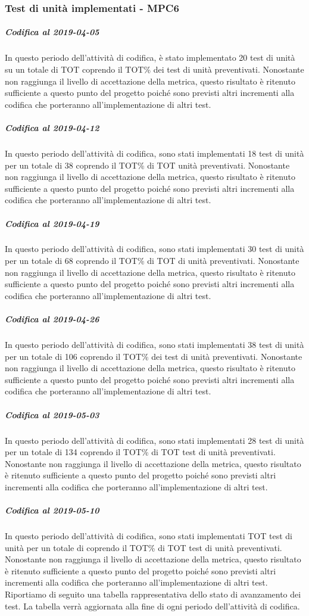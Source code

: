 \subsubsection{Test di unità implementati - MPC6}
\subparagraph{Codifica al 2019-04-05}
In questo periodo dell'attività di codifica, è stato implementato 20 test di unità su un totale di TOT coprendo il TOT\% dei test di unità preventivati.
Nonostante non raggiunga il livello di accettazione della
metrica, questo risultato è ritenuto sufficiente a questo punto del progetto poiché sono previsti altri incrementi alla codifica che porteranno all'implementazione di altri test.

\subparagraph{Codifica al 2019-04-12}
In questo periodo dell'attività di codifica, sono stati implementati 18 test di unità per un totale di 38 coprendo il TOT\% di TOT unità preventivati.
Nonostante non raggiunga il livello di accettazione della
metrica, questo risultato è ritenuto sufficiente a questo punto del progetto poiché sono previsti altri incrementi alla codifica che porteranno all'implementazione di altri test.

\subparagraph{Codifica al 2019-04-19}
In questo periodo dell'attività di codifica, sono stati implementati 30 test di unità per un totale di 68 coprendo il TOT\% di TOT di unità preventivati.
Nonostante non raggiunga il livello di accettazione della
metrica, questo risultato è ritenuto sufficiente a questo punto del progetto poiché sono previsti altri incrementi alla codifica che porteranno all'implementazione di altri test.

\subparagraph{Codifica al 2019-04-26}
In questo periodo dell'attività di codifica, sono stati implementati 38 test di unità per un totale di 106 coprendo il TOT\% dei test di unità preventivati.
Nonostante non raggiunga il livello di accettazione della
metrica, questo risultato è ritenuto sufficiente a questo punto del progetto poiché sono previsti altri incrementi alla codifica che porteranno all'implementazione di altri test.

\subparagraph{Codifica al 2019-05-03}
In questo periodo dell'attività di codifica, sono stati implementati 28 test di unità per un totale di 134 coprendo il TOT\% di TOT test di unità preventivati.
Nonostante non raggiunga il livello di accettazione della
metrica, questo risultato è ritenuto sufficiente a questo punto del progetto poiché sono previsti altri incrementi alla codifica che porteranno all'implementazione di altri test.

\subparagraph{Codifica al 2019-05-10}
In questo periodo dell'attività di codifica, sono stati implementati TOT test di unità per un totale di  coprendo il TOT\% di TOT test di unità preventivati.
Nonostante non raggiunga il livello di accettazione della
metrica, questo risultato è ritenuto sufficiente a questo punto del progetto poiché sono previsti altri incrementi alla codifica che porteranno all'implementazione di altri test.
\\Riportiamo di seguito una tabella rappresentativa dello stato di avanzamento dei test. La tabella verrà aggiornata alla fine di ogni periodo dell'attività di codifica.

